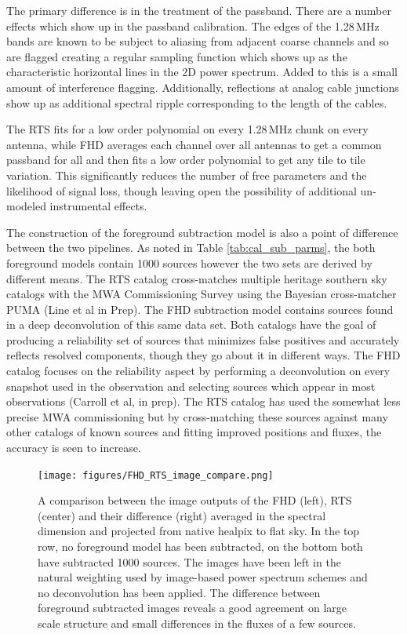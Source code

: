 \documentclass[twolcolumn,iop]{emulateapj}
\begin{document}
The primary difference is in the treatment of the passband.  There are a number effects which show up in the passband calibration. The edges of the 1.28\,MHz bands are known to be subject to aliasing from adjacent coarse channels and so are flagged creating a regular sampling function which shows up as the characteristic horizontal lines in the 2D power spectrum. Added to this is a small amount of interference flagging.  Additionally, reflections at analog cable junctions show up as additional spectral ripple corresponding to the length of the cables.    

The RTS fits for a low order polynomial on every 1.28\,MHz chunk on every antenna, while FHD averages each channel over all antennas to get a common passband for all and then fits a low order polynomial to get any tile to tile variation. This significantly reduces the number of free parameters and the likelihood of signal loss, though leaving open the possibility of additional un-modeled instrumental effects.

The construction of the foreground subtraction model is also a point of difference between the two pipelines.
As noted in Table \ref{tab:cal_sub_parms}, the both foreground models contain 1000 sources however the two sets are derived by different means. The RTS catalog cross-matches multiple heritage southern sky catalogs with the MWA Commissioning Survey using the Bayesian cross-matcher PUMA (Line et al in Prep).  The FHD subtraction model contains sources found in a deep deconvolution of this same data set. Both catalogs have the goal of producing a reliability set of sources that minimizes false positives and accurately reflects resolved components, though they go about it in different ways. The FHD catalog focuses on the reliability aspect by performing a deconvolution on every snapshot used in the observation and selecting sources which appear in most observations (Carroll et al, in prep). The RTS catalog has used the somewhat less precise MWA commissioning but by cross-matching these sources against many other catalogs of known sources and fitting improved positions and fluxes, the accuracy is seen to increase.


\begin{figure}[htb]
\begin{center}
\texttt{[image: figures/FHD\_RTS\_image\_compare.png]}

\caption{A comparison between the image outputs of the FHD (left), RTS (center) and their difference (right) averaged in the spectral dimension and projected from native healpix to flat sky.  In the top row, no foreground model has been subtracted, on the bottom both have subtracted 1000 sources.  The images have been left in the natural weighting used by image-based power spectrum schemes and no deconvolution has been applied. The difference between foreground subtracted images reveals a good agreement on large scale structure and small differences in the fluxes of a few sources.
\label{fig:image_compare}}
\end{center}
\end{figure}
\end{document}
